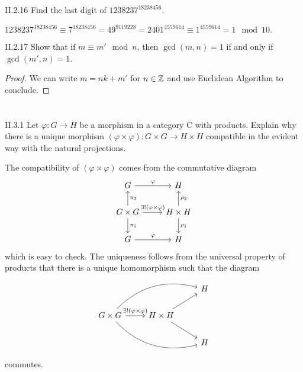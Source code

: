 \begin{problem}{II.2.16}
Find the last digit of $1238237^{18238456}$.
\end{problem}
\begin{solution}
$
1238237^{18238456} \equiv 7^{18238456} = 49^{9119228} = 2401^{4559614} \equiv 1^{4559614} = 1 \mod 10.
$
\end{solution}

\begin{problem}{II.2.17}
Show that if $m \equiv m' \mod n$, then $\gcd(m, n) = 1$ if and only if $\gcd(m', n) = 1$.
\end{problem}
\begin{proof}
We can write $m = nk + m'$ for $n \in \mathbb{Z}$ and use Euclidean Algorithm to conclude.
\end{proof}

\section{}

\begin{problem}{II.3.1}
Let $\varphi: G \to H$ be a morphism in a category \textsf{C} with products. Explain why there is a unique morphism $(\varphi \times \varphi) : G \times G \to H \times H$ compatible in the evident way with the natural projections.  
\end{problem}
\begin{solution}
The compatibility of $(\varphi \times \varphi)$ comes from the commutative diagram
\[
\begin{tikzcd}
G \arrow[r, "\varphi"]    & H          \\
G \times G \arrow[r, "\exists!(\varphi \times \varphi)"] \arrow[d, "\pi_1"] \arrow[u, "\pi_2"'] & H \times H \arrow[d, "\rho_1"] \arrow[u, "\rho_2"'] \\
G \arrow[r, "\varphi"]  & H   
\end{tikzcd}  
\]
which is easy to check. The uniqueness follows from the universal property of products that there is a unique homomorphism such that the diagram
\[
\begin{tikzcd}
&   & H \\
G \times G \arrow[rru, bend left] \arrow[rrd, bend right] \arrow[r, "\exists ! (\varphi \times \varphi)"] & H \times H \arrow[ru] \arrow[rd] &   \\
&   & H
\end{tikzcd}
\]
commutes.
\end{solution}


